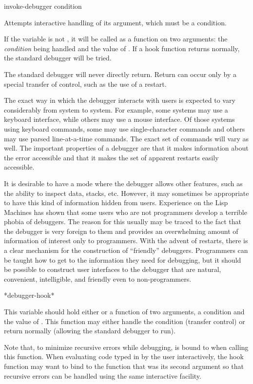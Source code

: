 \begin{defun}[Function]
invoke-debugger condition

Attempts interactive handling of its argument, which must be a condition.

If the variable  is not , it will be called as a
function on two arguments: the \emph{condition} being handled and the value of
.  If a hook function returns normally, the standard
debugger will be tried.

The standard debugger will never directly return. Return can occur only by a
special transfer of control, such as the use of a restart.

\beforenoterule
\begin{sideremark} 
The exact way in which the debugger interacts with users is
expected to vary considerably from system to system. For example, some systems
may use a keyboard interface, while others may use a mouse interface. Of those
systems using keyboard commands, some may use single-character commands and
others may use parsed line-at-a-time commands. The exact set of commands will
vary as well. The important properties of a debugger are that it makes
information about the error accessible and that it makes the set of apparent
restarts easily accessible.

It is desirable to have a mode where the debugger allows other features, such as
the ability to inspect data, stacks, etc. However, it may sometimes be
appropriate to have this kind of information hidden from users. Experience on
the Lisp Machines has shown that some users who are not programmers develop a
terrible phobia of debuggers. The reason for this usually may be traced to the
fact that the debugger is very foreign to them and provides an overwhelming
amount of information of interest only to programmers. With the advent of
restarts, there is a clear mechanism for the construction of ``friendly''
debuggers. Programmers can be taught how to get to the information they need for
debugging, but it should be possible to construct user interfaces to the
debugger that are natural, convenient, intelligible, and friendly even to
non-programmers.
\end{sideremark}
\afternoterule
\end{defun}

\begin{defun}[Variable]
*debugger-hook*

This variable should hold either  or a function of two arguments, a
condition and the value of . This function may either handle
the condition (transfer control) or return normally (allowing the standard
debugger to run).

Note that, to minimize recursive errors while debugging,  is
bound to  when calling this function. When evaluating code typed in by
the user interactively, the hook function may want to bind 
to the function that was its second argument so that recursive errors can be
handled using the same interactive facility.
\end{defun}


